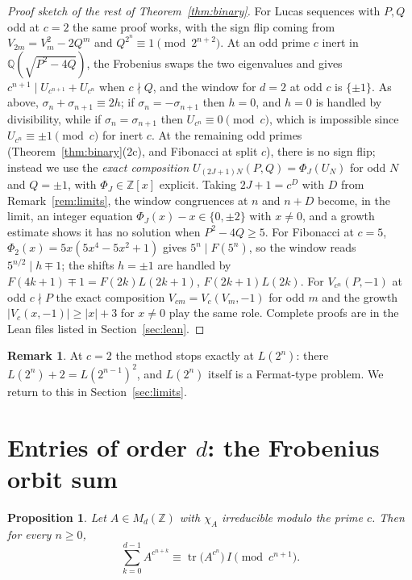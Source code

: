 \documentclass[11pt]{amsart}
\newtheorem{proposition}[theorem]{Proposition}
\theoremstyle{definition}
\newtheorem{remark}[theorem]{Remark}
\newcommand{\Z}{\mathbb{Z}}
\newcommand{\Q}{\mathbb{Q}}
\newcommand{\tr}{\operatorname{tr}}
\begin{document}
\begin{proof}[Proof sketch of the rest of Theorem~\ref{thm:binary}]
For Lucas sequences with $P,Q$ odd at $c=2$ the same proof works, with the sign flip coming from $V_{2m}=V_m^2-2Q^m$ and $Q^{2^n}\equiv1\pmod{2^{n+2}}$.  At an odd prime $c$ inert in $\Q(\sqrt{P^2-4Q})$, the Frobenius swaps the two eigenvalues and gives $c^{n+1}\mid U_{c^{n+1}}+U_{c^n}$ when $c\nmid Q$, and the window for $d=2$ at odd $c$ is $\{\pm1\}$.  As above, $\sigma_n+\sigma_{n+1}\equiv2h$; if $\sigma_n=-\sigma_{n+1}$ then $h=0$, and $h=0$ is handled by divisibility, while if $\sigma_n=\sigma_{n+1}$ then $U_{c^n}\equiv0\pmod c$, which is impossible since $U_{c^n}\equiv\pm1\pmod c$ for inert $c$.  At the remaining odd primes (Theorem~\ref{thm:binary}(2c), and Fibonacci at split $c$), there is no sign flip; instead we use the \emph{exact composition} $U_{(2J+1)N}(P,Q)=\Phi_J(U_N)$ for odd $N$ and $Q=\pm1$, with $\Phi_J\in\Z[x]$ explicit.  Taking $2J+1=c^{D}$ with $D$ from Remark~\ref{rem:limits}, the window congruences at $n$ and $n+D$ become, in the limit, an integer equation $\Phi_J(x)-x\in\{0,\pm2\}$ with $x\neq0$, and a growth estimate shows it has no solution when $P^2-4Q\ge5$.  For Fibonacci at $c=5$, $\Phi_2(x)=5x(5x^4-5x^2+1)$ gives $5^n\mid F(5^n)$, so the window reads $5^{n/2}\mid h\mp1$; the shifts $h=\pm1$ are handled by $F(4k+1)\mp1=F(2k)L(2k+1)$, $F(2k+1)L(2k)$.  For $V_{c^n}(P,-1)$ at odd $c\nmid P$ the exact composition $V_{cm}=V_c(V_m,-1)$ for odd $m$ and the growth $|V_c(x,-1)|\ge|x|+3$ for $x\ne0$ play the same role.  Complete proofs are in the Lean files listed in Section~\ref{sec:lean}.
\end{proof}

\begin{remark}
At $c=2$ the method stops exactly at $L(2^n)$: there $L(2^n)+2=L(2^{n-1})^2$, and $L(2^n)$ itself is a Fermat-type problem.  We return to this in Section~\ref{sec:limits}.
\end{remark}

\section{Entries of order $d$: the Frobenius orbit sum}\label{sec:orderd}

\begin{proposition}\label{prop:orbitsum}
Let $A\in M_d(\Z)$ with $\chi_A$ irreducible modulo the prime $c$.  Then for every $n\ge0$,
\[ \sum_{k=0}^{d-1}A^{c^{n+k}}\equiv \tr\!\big(A^{c^n}\big)\,I\pmod{c^{n+1}}. \]
\end{proposition}
\end{document}
